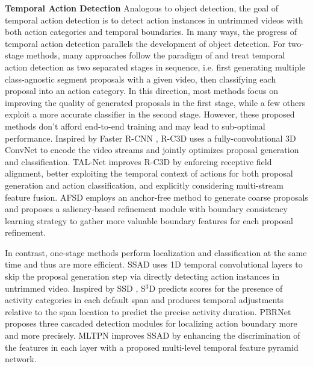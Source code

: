 \documentclass[final]{cvpr}
\begin{document}
\textbf{Temporal Action Detection}
Analogous to object detection, the goal of temporal action detection is to detect action instances in untrimmed videos with both action categories and temporal boundaries. In many ways, the progress of temporal action detection parallels the development of object detection. 
For two-stage methods, many approaches \cite{gao2018ctap, lin2018bsn, lin2019bmn, zeng2019graph, liu2019multi, zhao2020bottom, gao2020accurate, bai2020boundary, su2020bsn++, qing2021temporal, shou2017cdc, zhao2017temporal} follow the paradigm of \cite{girshick2014rich, girshick2015fast} and treat temporal action detection as two separated stages in sequence, i.e. first generating multiple class-agnostic segment proposals with a given video, then classifying each proposal into an action category. In this direction, most methods \cite{gao2018ctap, lin2018bsn, lin2019bmn, zeng2019graph, liu2019multi, lin2020fast, zhao2020bottom, gao2020accurate, bai2020boundary, su2020bsn++, qing2021temporal} focus on improving the quality of generated proposals in the first stage, while a few others \cite{shou2017cdc, zhao2017temporal} exploit a more accurate classifier in the second stage. However, these proposed methods don't afford end-to-end training and may lead to sub-optimal performance. Inspired by Faster R-CNN \cite{ren2016faster}, R-C3D \cite{xu2017r} uses a fully-convolutional 3D ConvNet to encode the video streams and jointly optimizes proposal generation and classification. TAL-Net \cite{chao2018rethinking} improves R-C3D \cite{xu2017r} by enforcing receptive field alignment, better exploiting the temporal context of actions for both proposal generation and action classification, and explicitly considering multi-stream feature fusion. AFSD \cite{lin2021learning} employs an anchor-free method to generate coarse proposals and proposes a saliency-based refinement module with boundary consistency learning strategy to gather more valuable boundary features for each proposal refinement. 

In contrast, one-stage methods \cite{lin2017single, zhang2018s3d, liu2020progressive, wang2020multi} perform localization and classification at the same time and thus are more efficient. SSAD \cite{lin2017single} uses 1D temporal convolutional layers to skip the proposal generation step via directly detecting action instances in untrimmed video. Inspired by SSD \cite{liu2016ssd}, S$^3$D \cite{zhang2018s3d} predicts scores for the presence of activity categories in each default span and produces temporal adjustments relative to the span location to predict the precise activity duration. PBRNet \cite{liu2020progressive} proposes three cascaded detection modules for localizing action boundary more and more precisely. MLTPN \cite{wang2020multi} improves SSAD \cite{lin2017single} by enhancing the discrimination of the features in each layer with a proposed multi-level temporal feature pyramid network. 
\end{document}
